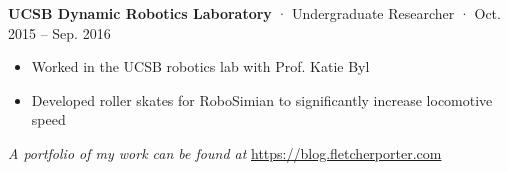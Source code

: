 \documentclass[12pt, oneside]{article}
\newcommand{\jobtitle}[3] {
	{\bf #1} · {#2} · {#3} \vspace{-7pt} \\
}
\begin{document}
\begin{flushleft}
\jobtitle{UCSB Dynamic Robotics Laboratory}{Undergraduate Researcher}{Oct. 2015 – Sep. 2016}
\begin{itemize}
	\item Worked in the UCSB robotics lab with Prof. Katie Byl
	\item Developed roller skates for RoboSimian to significantly increase locomotive speed
\end{itemize}

\nocite{Porter2024a,Porter2024,Porter2023,Wilcox2017}
\printbibliography[title=Publications]


\textit{A portfolio of my work can be found at} \url{https://blog.fletcherporter.com}

\end{flushleft}
\end{document}
